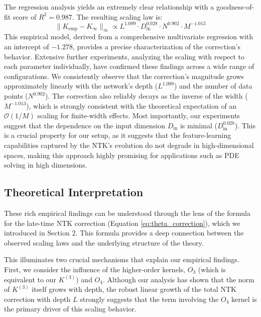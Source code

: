 \documentclass[a4paper]{article}
\begin{document}
The regression analysis yields an extremely clear relationship with a goodness-of-fit score of $R^2 = 0.987$. The resulting scaling law is:
\begin{equation}
    \|K_{\text{emp}} - K_{\infty}\|_\infty \propto L^{1.099} \cdot D_{\text{in}}^{0.028} \cdot N^{0.902} \cdot M^{-1.013}
    \label{eq:scaling_law}
\end{equation}
This empirical model, derived from a comprehensive multivariate regression with an intercept of $-1.278$, provides a precise characterization of the correction's behavior. Extensive further experiments, analyzing the scaling with respect to each parameter individually, have confirmed these findings across a wide range of configurations. We consistently observe that the correction's magnitude grows approximately linearly with the network's depth ($L^{1.099}$) and the number of data points ($N^{0.902}$). The correction also reliably decays as the inverse of the width ($M^{-1.013}$), which is strongly consistent with the theoretical expectation of an $\mathcal{O}(1/M)$ scaling for finite-width effects. Most importantly, our experiments suggest that the dependence on the input dimension $D_{\text{in}}$ is minimal ($D_{\text{in}}^{0.028}$). This is a crucial property for our setup, as it suggests that the feature-learning capabilities captured by the NTK's evolution do not degrade in high-dimensional spaces, making this approach highly promising for applications such as PDE solving in high dimensions.

\subsection{Theoretical Interpretation}

These rich empirical findings can be understood through the lens of the formula for the late-time NTK correction (Equation \ref{eq:theta_correction}), which we introduced in Section 2. This formula provides a deep connection between the observed scaling laws and the underlying structure of the theory.

This illuminates two crucial mechanisms that explain our empirical findings. First, we consider the influence of the higher-order kernels, $O_3$ (which is equivalent to our $K^{(3)}$) and $O_4$. Although our analysis has shown that the norm of $K^{(3)}$ itself grows with depth, the robust linear growth of the total NTK correction with depth $L$ strongly suggests that the term involving the $O_4$ kernel is the primary driver of this scaling behavior.
\end{document}

